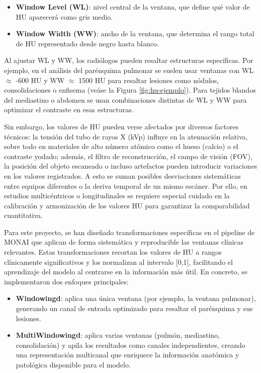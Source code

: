 \begin{itemize}
    \item \textbf{Window Level (WL)}: nivel central de la ventana, que define qué valor de HU aparecerá como gris medio.
    \item \textbf{Window Width (WW)}: ancho de la ventana, que determina el rango total de HU representado desde negro hasta blanco.
\end{itemize}

Al ajustar WL y WW, los radiólogos pueden resaltar estructuras específicas. Por ejemplo, en el análisis del parénquima pulmonar se suelen usar ventanas con WL $\approx$ -600 HU y WW $\approx$ 1500 HU para resaltar lesiones como nódulos, consolidaciones o enfisema (veáse la Figura \ref{fig:hu-ejemplo}). Para tejidos blandos del mediastino o abdomen se usan combinaciones distintas de WL y WW para optimizar el contraste en esas estructuras.

Sin embargo, los valores de HU pueden verse afectados por diversos factores técnicos: la tensión del tubo de rayos X (kVp) influye en la atenuación relativa, sobre todo en materiales de alto número atómico como el hueso (calcio) o el contraste yodado; además, el filtro de reconstrucción, el campo de visión (FOV), la posición del objeto escaneado o incluso artefactos pueden introducir variaciones en los valores registrados. A esto se suman posibles desviaciones sistemáticas entre equipos diferentes o la deriva temporal de un mismo escáner. Por ello, en estudios multicéntricos o longitudinales se requiere especial cuidado en la calibración y armonización de los valores HU para garantizar la comparabilidad cuantitativa.

Para este proyecto, se han diseñado transformaciones específicas en el pipeline de MONAI que aplican de forma sistemática y reproducible las ventanas clínicas relevantes. Estas transformaciones recortan los valores de HU a rangos clínicamente significativos y los normalizan al intervalo [0,1], facilitando el aprendizaje del modelo al centrarse en la información más útil. En concreto, se implementaron dos enfoques principales:

\begin{itemize}
    \item \textbf{Windowingd}: aplica una única ventana (por ejemplo, la ventana pulmonar), generando un canal de entrada optimizado para resaltar el parénquima y sus lesiones.
    \item \textbf{MultiWindowingd}: aplica varias ventanas (pulmón, mediastino, consolidación) y apila los resultados como canales independientes, creando una representación multicanal que enriquece la información anatómica y patológica disponible para el modelo.
\end{itemize}

